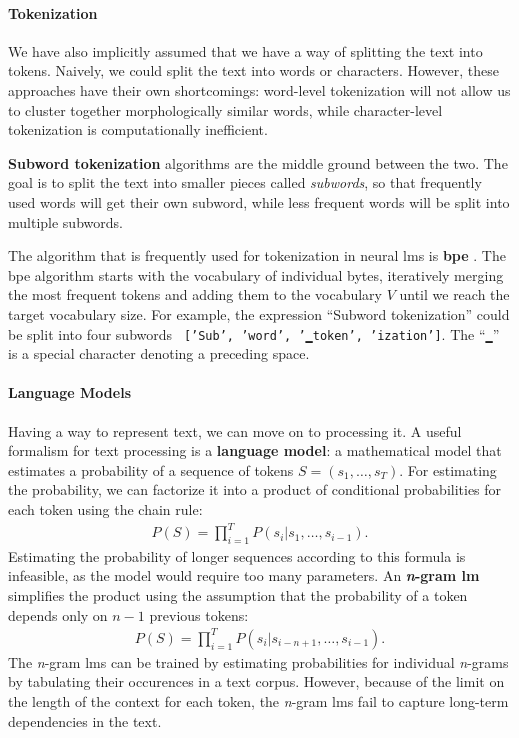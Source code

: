 \paragraph{Tokenization} We have also implicitly assumed that we have a way of splitting the text into tokens. Naively, we could split the text into words or characters. However, these approaches have their own shortcomings: word-level tokenization will not allow us to cluster together morphologically similar words, while character-level tokenization is computationally inefficient.

\textbf{Subword tokenization} algorithms are the middle ground between the two. The goal is to split the text into smaller pieces called \emph{subwords}, so that frequently used words will get their own subword, while less frequent words will be split into multiple subwords.

The algorithm that is frequently used for tokenization in neural \acp{lm} is \textbf{\ac{bpe}} . The \ac{bpe} algorithm starts with the vocabulary of individual bytes, iteratively merging the most frequent tokens and adding them to the vocabulary $V$ until we reach the target vocabulary size. For example, the expression ``Subword tokenization'' could be split into four subwords \texttt{ ['Sub', 'word', '▁token', 'ization']}. The ``\texttt{▁}'' is a special character denoting a preceding space.

\paragraph{Language Models} Having a way to represent text, we can move on to processing it. A useful formalism for text processing is a \textbf{language model}: a mathematical model that estimates a probability of a sequence of tokens $S = (s_1, \ldots, s_T)$. For estimating the probability, we can factorize it into a product of conditional probabilities for each token using the chain rule:
\begin{align}
    P(S) = \prod_{i=1}^T P(s_i|s_1, \hdots, s_{i-1}).
\end{align}
Estimating the probability of longer sequences according to this formula is infeasible, as the model would require too many parameters. An \textbf{\emph{n}-gram \ac{lm}} simplifies the product using the assumption that the probability of a token depends only on $n-1$ previous tokens:
\begin{align}
    P(S) = \prod_{i=1}^T P(s_i|s_{i-n+1}, \hdots,s_{i-1}).
\end{align}
The \emph{n}-gram \acp{lm} can be trained by estimating probabilities for individual \emph{n}-grams by tabulating their occurences in a text corpus. However, because of the limit on the length of the context for each token, the \emph{n}-gram \acp{lm} fail to capture long-term dependencies in the text.

